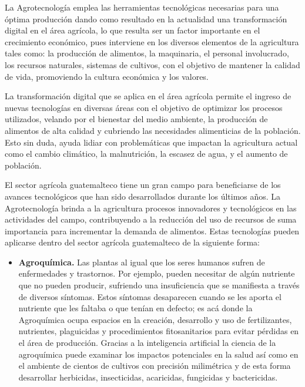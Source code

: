 \documentclass[12pt,spanish,Letterpaper,openany]{book}
\providecommand{\tightlist}{%
  \setlength{\itemsep}{0pt}\setlength{\parskip}{0pt}}
\newcommand{\spacefourmilis}{\vspace{4mm}}
\begin{document}
La Agrotecnología emplea las herramientas tecnológicas necesarias para una óptima producción dando como resultado en la actualidad una transformación digital en el área agrícola, lo que resulta ser un factor importante en el crecimiento económico, pues interviene en los diversos elementos de la agricultura tales como: la producción de alimentos, la maquinaria, el personal involucrado, los recursos naturales, sistemas de cultivos, con el objetivo de mantener la calidad de vida, promoviendo la cultura económica y los valores.

La transformación digital que se aplica en el área agrícola permite el ingreso de nuevas tecnologías en diversas áreas con el objetivo de optimizar los procesos utilizados, velando por el bienestar del medio ambiente, la producción de alimentos de alta calidad y cubriendo las necesidades alimenticias de la población. Esto sin duda, ayuda lidiar con problemáticas que impactan la agricultura actual como el cambio climático, la malnutrición, la escasez de agua, y el aumento de población.

El sector agrícola guatemalteco tiene un gran campo para beneficiarse de los avances tecnológicos que han sido desarrollados durante los últimos años. La Agrotecnología brinda a la agricultura procesos innovadores y tecnológicos en las actividades del campo, contribuyendo a la reducción del uso de recursos de suma importancia para incrementar la demanda de alimentos. Estas tecnologías pueden aplicarse dentro del sector agrícola guatemalteco de la siguiente forma:

\spacefourmilis

\begin{itemize}
\tightlist
\item
  \textbf{Agroquímica.} Las plantas al igual que los seres humanos sufren de enfermedades y trastornos. Por ejemplo, pueden necesitar de algún nutriente que no pueden producir, sufriendo una insuficiencia que se manifiesta a través de diversos síntomas. Estos síntomas desaparecen cuando se les aporta el nutriente que les faltaba o que tenían en defecto; es acá donde la Agroquímica ocupa espacios en la creación, desarrollo y uso de fertilizantes, nutrientes, plaguicidas y procedimientos fitosanitarios para evitar pérdidas en el área de producción. Gracias a la inteligencia artificial la ciencia de la agroquímica puede examinar los impactos potenciales en la salud así como en el ambiente de cientos de cultivos con precisión milimétrica y de esta forma desarrollar herbicidas, insecticidas, acaricidas, fungicidas y bactericidas.
\end{itemize}
\end{document}
